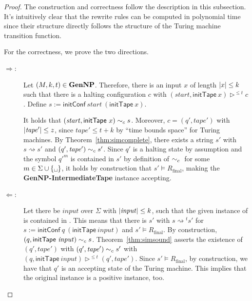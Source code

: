 \documentclass[a4paper,UKenglish,cleveref, autoref]{lipics-v2019}
\newcommand{\strent}{\rightsquigarrow}
\newcommand{\Rfinal}{R_{\text{final}}}
\begin{document}
\begin{proof}
  The construction and correctness follow the description in this subsection. 
  It's intuitively clear that the rewrite rules can be computed in polynomial time since their structure directly follows the structure of the Turing machine transition function. 

  For the correctness, we prove the two directions. 
  \begin{description}
    \item[$\Rightarrow$:]
      Let $(M, k, t) \in \textbf{GenNP}{}$. Therefore, there is an input $x$ of length $|x| \le k$ such that there is a halting configuration $c$ with $(\mathit{start}, \textsf{initTape}~x) \rhd^{\le t} c$. Define $s := \textsf{initConf}~\mathit{start}~(\textsf{initTape}~x)$.  

      It holds that $(\mathit{start}, \textsf{initTape}~x) \sim_c{} s$. 
      Moreover, $c = (q', \mathit{tape}')$ with $|\mathit{tape}'| \le z$, since $\mathit{tape}' \le t + k$ by ``time bounds space'' for Turing machines. By Theorem~\ref{thm:simcomplete}, there exists a string $s'$ with $s \strent{} s'$ and $(q', \mathit{tape}') \sim_c{} s'$. Since $q'$ is a halting state by assumption and the symbol ${q'}^m$ is contained in $s'$ by definition of $\sim_c{}$ for some $m \in \Sigma \cup \{\blank\}$, it holds by construction that $s' \models \Rfinal$, making the \textbf{GenNP-IntermediateTape} instance accepting.

    \item[$\Leftarrow$:]
      Let there be $\mathit{input}$ over $\Sigma$ with $|\mathit{input}| \le k$, such that the given instance of \strconrew{} is contained in \strconrew{}. This means that there is $s'$ with $s \strent{}^t s'$ for $s := \textsf{initConf}~q~(\textsf{initTape}~\mathit{input})$ and $s' \models \Rfinal$.  
      By construction, $(q, \textsf{initTape}~\mathit{input}) \sim_c{} s$. Theorem~\ref{thm:simsound} asserts the existence of $(q', \mathit{tape}')$ with $(q', \mathit{tape}') \sim_c{} s'$ with $(q, \textsf{initTape}~\mathit{input}) \rhd^{\le t} (q', \mathit{tape}')$. Since $s' \models \Rfinal$, by construction, we have that $q'$ is an accepting state of the Turing machine. This implies that the original \gennp{} instance is a positive instance, too.
  \end{description}
\end{proof}
\end{document}

